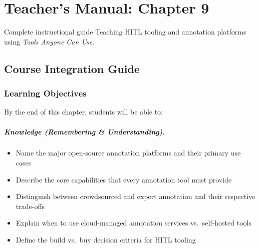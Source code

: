 
\chapter{Teacher's Manual: Chapter 9}
\label{ch:teacher-ch09}

\begin{chapterquote}{Complete instructional guide}
Teaching HITL tooling and annotation platforms using \emph{Tools Anyone Can Use}.
\end{chapterquote}

\section{Course Integration Guide}

\subsection{Learning Objectives}

By the end of this chapter, students will be able to:

\paragraph{Knowledge (Remembering \& Understanding).}
\begin{itemize}
    \item Name the major open-source annotation platforms and their primary use cases
    \item Describe the core capabilities that every annotation tool must provide
    \item Distinguish between crowdsourced and expert annotation and their respective trade-offs
    \item Explain when to use cloud-managed annotation services vs.\ self-hosted tools
    \item Define the build vs.\ buy decision criteria for HITL tooling
\end{itemize}

